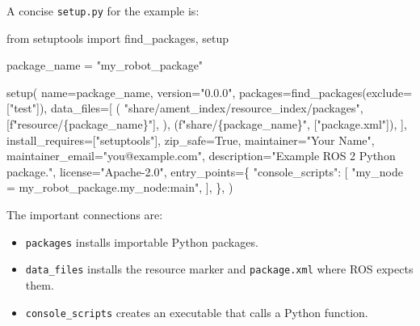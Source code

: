 \documentclass[
  australian,
  12pt,
  letterpaper,
  DIV=11,
  numbers=noendperiod,
  twoside]{scrreprt}
\newenvironment{Shaded}{\begin{snugshade}}{\end{snugshade}}
\newcommand{\ImportTok}[1]{\textcolor[rgb]{0.00,0.46,0.62}{#1}}
\newcommand{\NormalTok}[1]{\textcolor[rgb]{0.00,0.23,0.31}{#1}}
\newcommand{\OperatorTok}[1]{\textcolor[rgb]{0.37,0.37,0.37}{#1}}
\newcommand{\SpecialCharTok}[1]{\textcolor[rgb]{0.37,0.37,0.37}{#1}}
\newcommand{\SpecialStringTok}[1]{\textcolor[rgb]{0.13,0.47,0.30}{#1}}
\newcommand{\StringTok}[1]{\textcolor[rgb]{0.13,0.47,0.30}{#1}}
\newcommand{\VariableTok}[1]{\textcolor[rgb]{0.07,0.07,0.07}{#1}}
\providecommand{\tightlist}{%
  \setlength{\itemsep}{0pt}\setlength{\parskip}{0pt}}
\begin{document}
A concise \texttt{setup.py} for the example is:

\begin{Shaded}
\begin{Highlighting}[]
\ImportTok{from}\NormalTok{ setuptools }\ImportTok{import}\NormalTok{ find\_packages, setup}

\NormalTok{package\_name }\OperatorTok{=} \StringTok{"my\_robot\_package"}

\NormalTok{setup(}
\NormalTok{    name}\OperatorTok{=}\NormalTok{package\_name,}
\NormalTok{    version}\OperatorTok{=}\StringTok{"0.0.0"}\NormalTok{,}
\NormalTok{    packages}\OperatorTok{=}\NormalTok{find\_packages(exclude}\OperatorTok{=}\NormalTok{[}\StringTok{"test"}\NormalTok{]),}
\NormalTok{    data\_files}\OperatorTok{=}\NormalTok{[}
\NormalTok{        (}
            \StringTok{"share/ament\_index/resource\_index/packages"}\NormalTok{,}
\NormalTok{            [}\SpecialStringTok{f"resource/}\SpecialCharTok{\{}\NormalTok{package\_name}\SpecialCharTok{\}}\SpecialStringTok{"}\NormalTok{],}
\NormalTok{        ),}
\NormalTok{        (}\SpecialStringTok{f"share/}\SpecialCharTok{\{}\NormalTok{package\_name}\SpecialCharTok{\}}\SpecialStringTok{"}\NormalTok{, [}\StringTok{"package.xml"}\NormalTok{]),}
\NormalTok{    ],}
\NormalTok{    install\_requires}\OperatorTok{=}\NormalTok{[}\StringTok{"setuptools"}\NormalTok{],}
\NormalTok{    zip\_safe}\OperatorTok{=}\VariableTok{True}\NormalTok{,}
\NormalTok{    maintainer}\OperatorTok{=}\StringTok{"Your Name"}\NormalTok{,}
\NormalTok{    maintainer\_email}\OperatorTok{=}\StringTok{"you@example.com"}\NormalTok{,}
\NormalTok{    description}\OperatorTok{=}\StringTok{"Example ROS 2 Python package."}\NormalTok{,}
\NormalTok{    license}\OperatorTok{=}\StringTok{"Apache{-}2.0"}\NormalTok{,}
\NormalTok{    entry\_points}\OperatorTok{=}\NormalTok{\{}
        \StringTok{"console\_scripts"}\NormalTok{: [}
            \StringTok{"my\_node = my\_robot\_package.my\_node:main"}\NormalTok{,}
\NormalTok{        ],}
\NormalTok{    \},}
\NormalTok{)}
\end{Highlighting}
\end{Shaded}

The important connections are:

\begin{itemize}
\tightlist
\item
  \texttt{packages} installs importable Python packages.
\item
  \texttt{data\_files} installs the resource marker and
  \texttt{package.xml} where ROS expects them.
\item
  \texttt{console\_scripts} creates an executable that calls a Python
  function.
\end{itemize}
\end{document}
